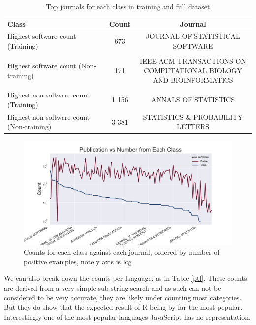 \documentclass[12pt, a4paper]{article}
\begin{document}
\begin{table}[H]
	\centering
	\begin{adjustbox}{center}
	\begin{tabular}{l cc}
		\toprule
		Class & Count & Journal\\
		\midrule
		Highest software count (Training)  &673&	JOURNAL OF STATISTICAL SOFTWARE\\
		& &\\
		Highest software count (Non-training)&171&	\pbox{20cm}{IEEE-ACM TRANSACTIONS ON \\COMPUTATIONAL BIOLOGY\\ AND BIOINFORMATICS}\\
		& &\\ 
		Highest non-software count (Training) & 1 156 & ANNALS OF STATISTICS\\
		Highest non-software count (Non-training) &3 381& STATISTICS \& PROBABILITY LETTERS\\
		\bottomrule
	\end{tabular}
\end{adjustbox}
	\caption{Top journals for each class in training and full dataset}\label{jtt}
\end{table}

\begin{figure}
	\includegraphics[width=0.9\linewidth]{countvpub.pdf}
	\caption{Counts for each class against each journal, ordered by number of positive examples, note y axis is log}\label{pvy}
\end{figure}

We can also break down the counts per language, as in Table \ref{ptl}. These counts are derived from a very simple sub-string search and as such can not be considered to be very accurate, they are likely under counting most categories. But they do show that the expected result of R being by far the most popular. Interestingly one of the most popular languages JavaScript has no representation.
\end{document}
